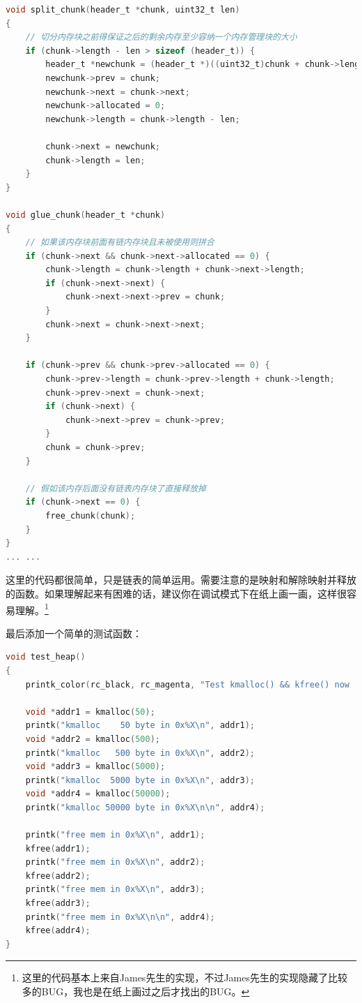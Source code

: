 \begin{lstlisting}[language = C, caption = mm/heap.c]
void split_chunk(header_t *chunk, uint32_t len)
{
	// 切分内存块之前得保证之后的剩余内存至少容纳一个内存管理块的大小
	if (chunk->length - len > sizeof (header_t)) {
		header_t *newchunk = (header_t *)((uint32_t)chunk + chunk->length);
		newchunk->prev = chunk;
		newchunk->next = chunk->next;
		newchunk->allocated = 0;
		newchunk->length = chunk->length - len;

		chunk->next = newchunk;
		chunk->length = len;
	}
}

void glue_chunk(header_t *chunk)
{
	// 如果该内存块前面有链内存块且未被使用则拼合
	if (chunk->next && chunk->next->allocated == 0) {
		chunk->length = chunk->length + chunk->next->length;
		if (chunk->next->next) {
			chunk->next->next->prev = chunk;
		}
		chunk->next = chunk->next->next;
	}

	if (chunk->prev && chunk->prev->allocated == 0) {
		chunk->prev->length = chunk->prev->length + chunk->length;
		chunk->prev->next = chunk->next;
		if (chunk->next) {
			chunk->next->prev = chunk->prev;
		}
		chunk = chunk->prev;
	}

	// 假如该内存后面没有链表内存块了直接释放掉
	if (chunk->next == 0) {
		free_chunk(chunk);
	}
}
... ...
\end{lstlisting}

\par 这里的代码都很简单，只是链表的简单运用。需要注意的是映射和解除映射并释放的函数。如果理解起来有困难的话，建议你在调试模式下在纸上画一画，这样很容易理解。\footnote{这里的代码基本上来自James先生的实现，不过James先生的实现隐藏了比较多的BUG，我也是在纸上画过之后才找出的BUG。}

\par 最后添加一个简单的测试函数：

\begin{lstlisting}[language = C, caption = mm/heap.c]
void test_heap()
{
	printk_color(rc_black, rc_magenta, "Test kmalloc() && kfree() now ...\n\n");

	void *addr1 = kmalloc(50);
	printk("kmalloc    50 byte in 0x%X\n", addr1);
	void *addr2 = kmalloc(500);
	printk("kmalloc   500 byte in 0x%X\n", addr2);
	void *addr3 = kmalloc(5000);
	printk("kmalloc  5000 byte in 0x%X\n", addr3);
	void *addr4 = kmalloc(50000);
	printk("kmalloc 50000 byte in 0x%X\n\n", addr4);

	printk("free mem in 0x%X\n", addr1);
	kfree(addr1);
	printk("free mem in 0x%X\n", addr2);
	kfree(addr2);
	printk("free mem in 0x%X\n", addr3);
	kfree(addr3);
	printk("free mem in 0x%X\n\n", addr4);
	kfree(addr4);
}
\end{lstlisting}

